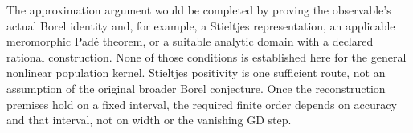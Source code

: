 The approximation argument would be completed by proving the
observable's actual Borel identity and, for example, a Stieltjes
representation, an applicable meromorphic Pad\'e theorem, or a suitable
analytic domain with a declared rational construction. None of those
conditions is established here for the general nonlinear population
kernel. Stieltjes positivity is one sufficient route, not an assumption
of the original broader Borel conjecture. Once the reconstruction
premises hold on a fixed interval, the required finite order depends
on accuracy and that interval, not on width or the vanishing GD step.

